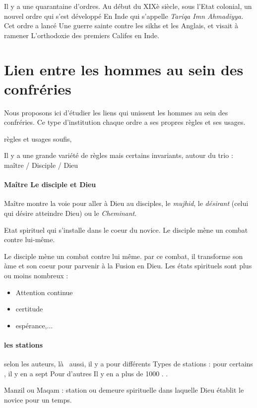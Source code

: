 Il y a une quarantaine 
d'ordres. Au début du XIXè siècle, sous l'Etat colonial,  un nouvel ordre 
qui  s'est développé 
En Inde qui  s'appelle \textit{Tariqa Imn Ahmadiyya.  } Cet ordre a lancé 
Une guerre sainte contre les sikhs et les 
Anglais, et  visait 
à  ramener 
L'orthodoxie des premiers 
Califes en Inde.  


\section{Lien entre les hommes au sein des confréries}

Nous proposons ici d'étudier les
liens qui unissent les hommes au sein des confréries. 
Ce type d'institution 
 chaque ordre 
 a ses propres règles et ses 
usages.
\begin{Def}[Adab]
     règles et usages soufis, 
\end{Def}
Il y a une grande variété de règles mais certains invariants, autour du trio : maître / Disciple / Dieu

\paragraph{Maître 
Le disciple et Dieu }
Maître montre la voie pour aller à Dieu au disciples, le \textit{mujhid}, le \textit{désirant} (celui qui désire atteindre Dieu) ou le \textit{Cheminant}. 

\begin{Def}[Hal]
   Etat spirituel qui s'installe dans le coeur du novice.  Le disciple mène un combat contre lui-même.
\end{Def}
 
Le disciple 
mène un combat 
contre lui même. par ce combat, il  transforme son àme et son coeur pour parvenir à la Fusion en Dieu. 
Les états spirituels sont plus ou moins nombreux : 
\begin{itemize}
    \item Attention continue
    \item certitude
    \item espérance,...

\end{itemize}

\paragraph{les stations}  selon les auteurs, là  aussi, il y a pour différents 
Types de stations : pour certains , il y en a sept  Pour d'autres 
Il y en a plus de 1000   .  
 . 
\begin{Def}[Manzil]
Manzil ou Maqam : station ou demeure spirituelle dans laquelle Dieu établit le novice pour un temps.
    
\end{Def}

